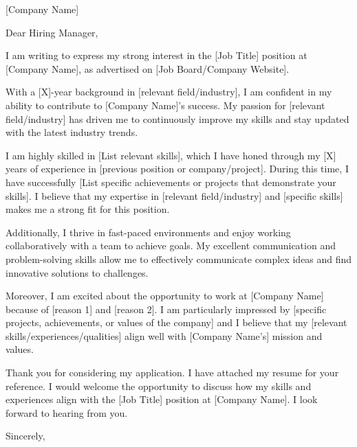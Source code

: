 \documentclass{letter}
\begin{document}
\begin{letter}{[Company Name]\\
[Company Address]}
\opening{Dear Hiring Manager,}

I am writing to express my strong interest in the [Job Title] position at [Company Name], as advertised on [Job Board/Company Website]. 

With a [X]-year background in [relevant field/industry], I am confident in my ability to contribute to [Company Name]'s success. My passion for [relevant field/industry] has driven me to continuously improve my skills and stay updated with the latest industry trends. 

I am highly skilled in [List relevant skills], which I have honed through my [X] years of experience in [previous position or company/project]. During this time, I have successfully [List specific achievements or projects that demonstrate your skills]. I believe that my expertise in [relevant field/industry] and [specific skills] makes me a strong fit for this position.

Additionally, I thrive in fast-paced environments and enjoy working collaboratively with a team to achieve goals. My excellent communication and problem-solving skills allow me to effectively communicate complex ideas and find innovative solutions to challenges.

Moreover, I am excited about the opportunity to work at [Company Name] because of [reason 1] and [reason 2]. I am particularly impressed by [specific projects, achievements, or values of the company] and I believe that my [relevant skills/experiences/qualities] align well with [Company Name's] mission and values.

Thank you for considering my application. I have attached my resume for your reference. I would welcome the opportunity to discuss how my skills and experiences align with the [Job Title] position at [Company Name]. I look forward to hearing from you.

\closing{Sincerely,}

\end{letter}
\end{document}
